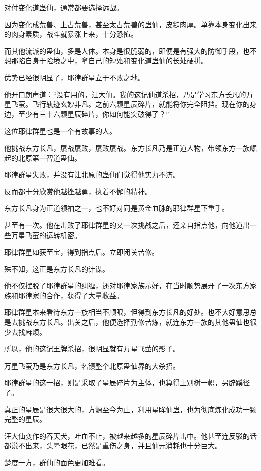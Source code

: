 \begin{this_body}
对付变化道蛊仙，通常都要选择远战。

因为变化成荒兽、上古荒兽，甚至太古荒兽的蛊仙，皮糙肉厚。单靠本身变化出来的肉身素质，战斗就暴涨上来，十分恐怖。

而其他流派的蛊仙，多是人体。本身是很脆弱的，即便是有强大的防御手段，也不想那陷自身于险境之中，拿自己的短处和变化道蛊仙的长处硬拼。

优势已经很明显了，耶律群星立于不败之地。

他开口朗声道：“没有用的，汪大仙。我的这记仙道杀招，乃是学习东方长凡的万星飞萤。飞行轨迹玄妙非凡。之前六颗星辰碎片，就能将你完全阻挡。现在你的身边，至少有三十六颗星辰碎片，你如何能突破得了？”

这位耶律群星也是一个有故事的人。

他挑战东方长凡，屡战屡败，屡败屡战。东方长凡乃是正道人物，带领东方一族崛起的北原第一智道蛊仙。

耶律群星失败，并没有让北原的蛊仙们觉得他实力不济。

反而都十分欣赏他越挫越勇，执着不懈的精神。

东方长凡身为正道领袖之一，也不好对同是黄金血脉的耶律群星下重手。

甚至有一次。他在击败了耶律群星的又一次挑战之后，还亲自指点他，向他道出一些万星飞萤的运转机密。

耶律群星如获至宝，得到指点后。立即闭关苦修。

殊不知，这正是东方长凡的计谋。

他不仅摆脱了耶律群星的纠缠，还对耶律家族示好，在当时顺势展开了一次东方家族和耶律家的合作，获得了大量收益。

耶律群星本来看待东方一族相当不顺眼，但得到东方长凡的好处。也不大好意思总是去挑战东方长凡。出关之后，他便选择勤修苦炼，就连东方一族的其他蛊仙也很少去找麻烦。

所以，他的这记王牌杀招，很明显就有万星飞萤的影子。

万星飞萤乃是东方长凡，名镇整个北原蛊仙界的大杀招。

耶律群星的这一招，则是采取了星辰碎片为主体，也算得上别树一帜，另辟蹊径了。

真正的星辰是很大很大的，方源至今为止，利用星眸仙蛊，也为彻底炼化成功一颗完整的星辰。

汪大仙变作的吞天犬，吐血不止，被越来越多的星辰碎片击中。他甚至连反驳的话都说不出来，头晕眼花，已然是重伤之身，并且仙元消耗也十分巨大。

楚度一方，群仙的面色更加难看。


\end{this_body}
